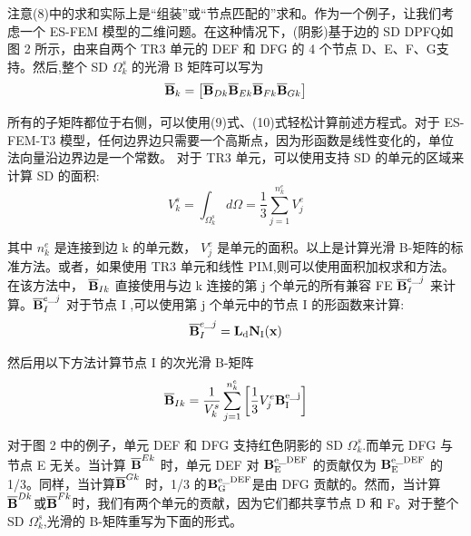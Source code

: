 \documentclass[12pt,a4paper]{article}
\begin{document}
注意(8)中的求和实际上是“组装”或“节点匹配的”求和。作为一个例子，让我们考虑一个 ES-FEM 模型的二维问题。在这种情况下，(阴影)基于边的 SD DPFQ如图 2 所示，由来自两个 TR3 单元的 DEF 和 DFG 的 4 个节点 D、E、F、G支持。然后,整个 SD $\Omega ^s_k$ 的光滑 B 矩阵可以写为
\begin{equation}
\overline{\rm\textbf{B}}_k=\left[\overline{\rm\textbf{B}}_{Dk}\overline{\rm\textbf{B}}_{Ek}\overline{\rm\textbf{B}}_{Fk}\overline{\rm\textbf{B}}_{Gk}\right]
\end{equation}

所有的子矩阵都位于右侧，可以使用(9)式、(10)式轻松计算前述方程式。对于 ES-FEM-T3 模型，任何边界边只需要一个高斯点，因为形函数是线性变化的，单位法向量沿边界边是一个常数。
对于 TR3 单元，可以使用支持 SD 的单元的区域来计算 SD 的面积:
\begin{equation}
V^s_k=\int_{\Omega ^s_k}^{}d\Omega=\frac{1}{3}\sum_{j=1}^{n^e_k} V^e_j
\end{equation}

其中 $n^e_k$ 是连接到边 k 的单元数， $V^e_j$ 是单元的面积。以上是计算光滑 B-矩阵的标
准方法。或者，如果使用 TR3 单元和线性 PIM,则可以使用面积加权求和方法。
在该方法中， $\overline{\rm\textbf{B}}_{Ik}$ 直接使用与边 k 连接的第 j 个单元的所有兼容 FE 
$\overline{\rm\textbf{B}}^{e\_j}_{I}$ 来计算。$\overline{\rm\textbf{B}}^{e\_j}_{I}$ 对于节点 I ,可以使用第 j 个单元中的节点 I 的形函数来计算:
\begin{equation}
\overline{\rm\textbf{B}}^{e\_j}_{I}= \rm\textbf{L}_d \rm\textbf{N}_I (\rm\textbf{x})
\end{equation}

然后用以下方法计算节点 I 的次光滑 B-矩阵
\begin{equation}
\overline{\rm\textbf{B}}_{Ik}=\frac{1}{V^s_k}\sum_{j=1}^{n^e_k}\left[\frac{1}{3}V^e_j\rm\textbf{B}^{e\_j}_I\right]
\end{equation}

对于图 2 中的例子，单元 DEF 和 DFG 支持红色阴影的 SD $\Omega ^s_k$.而单元 DFG
与节点 E 无关。当计算 $\overline{\rm\textbf{B}}^{Ek}$ 时，单元 DEF 对 $\rm\textbf{B}^{e\_{DEF}}_E$ 的贡献仅为 $\rm\textbf{B}^{e\_{DEF}}_E$ 的 1/3。同样，当计算$\overline{\rm\textbf{B}}^{Gk}$ 时，1/3 的$\rm\textbf{B}^{e\_{DEF}}_G$是由 DFG 贡献的。然而，当计算$\overline{\rm\textbf{B}}^{Dk}$或$\overline{\rm\textbf{B}}^{Fk}$时，我们有两个单元的贡献，因为它们都共享节点 D 和 F。对于整个 SD $\Omega ^s_k$,光滑的 B-矩阵重写为下面的形式。
\end{document}
